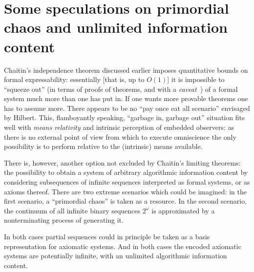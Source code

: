 \section{Some speculations on primordial chaos and unlimited information content}



Chaitin's independence theorem discussed earlier  imposes quantitative bounds on formal  expressability:
essentially [that is, up to $O(1)$] it is impossible to ``squeeze out''
(in terms of proofs of theorems, and with a {\it caveat}~\cite{lambalgen-89})
of a formal system much more than one has put in.
If one wants more provable theorems one has to assume more. There appears to be no ``pay once eat all scenario'' envisaged by Hilbert.
This, flamboyantly speaking, ``garbage in, garbage out'' situation fits well with {\em means relativity}
 and intrinsic perception of embedded observers: as there is no external
point of view from which to execute omniscience the only possibility is to perform relative to the (intrinsic) means available.

There is, however, another option not excluded by Chaitin's limiting theorems:
the possibility to obtain a system of arbitrary algorithmic information content
by considering subsequences of infinite sequences interpreted as formal systems, or as axioms thereof.
There are two extreme scenarios which could be imagined: in the first scenario, a ``primordial chaos'' is taken as a resource.
In the second scenario, the continuum of all infinite binary sequences $2^\omega$ is approximated by a nonterminating process of generating it.

In both cases partial sequences could in principle be taken as a basis representation for axiomatic systems.
And in both cases the encoded axiomatic systems are potentially infinite, with an unlimited algorithmic information content.
